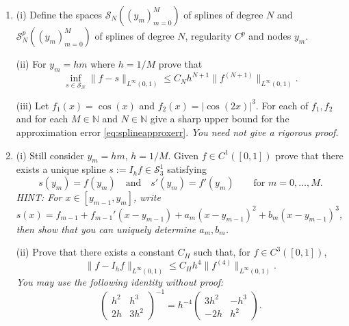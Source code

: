 \documentclass{exams}
\newcommand{\N}{\mathbb{N}}
\begin{document}
\begin{examcomp1}
\begin{question}
\begin{enumerate}
  \item (i) Define the spaces $\mathcal{S}_N((y_m)_{m=0}^M)$ of splines of
    degree $N$ and  $\mathcal{S}_N^p((y_m)_{m=0}^M)$ of splines of degree $N$,
    regularity $C^p$ and nodes $y_m$. 

    (ii) For $y_m = h m$ where $h = 1/M$ prove that  
    \begin{equation} \label{eq:splineapproxerr}
        \inf_{s \in \mathcal{S}_N} \|f - s \|_{L^\infty(0,1)}
        \leq 
        C_N h^{N+1} \| f^{(N+1)} \|_{L^\infty(0,1)}.
    \end{equation}

    (iii) Let $f_1(x) = \cos(x)$ and $f_2(x) = |\cos(2x)|^3$. 
    For each of $f_1, f_2$ and for each $M \in \N$ and $N \in \N$ give a
    sharp upper bound for the approximation error \eqref{eq:splineapproxerr}.
    {\it You need not give a rigorous proof.}

  \item (i) Still consider $y_m = h m$, $h = 1/M$. Given $f \in C^1([0,1])$
  prove that there exists a unique spline $s := I_h f \in \mathcal{S}_3^1$
  satisfying  
  \[
      s(y_m) = f(y_m) \quad \text{and} 
      \quad 
      s'(y_m) = f'(y_m) \qquad \text{for } m = 0, \dots, M.
  \]
  {\it HINT: For $x \in [y_{m-1}, y_m]$, write 
  $s(x) = f_{m-1} + f_{m-1}' (x-y_{m-1}) + a_m (x-y_{m-1})^2 
    + b_m (x - y_{m-1})^3$, then show that you can uniquely 
    determine $a_m, b_m$.}

  (ii) Prove that there exists a constant $C_H$ such that, 
  for $f \in C^3([0,1])$,   
  \[
      \| f - I_h f \|_{L^\infty(0,1)} \leq C_H h^4 \|f^{(4)}\|_{L^\infty(0,1)}.
  \]  
  {\it You may use the following identity without proof:
    \[
      \begin{pmatrix} 
        h^2 & h^3 \\ 
        2h & 3h^2 
      \end{pmatrix}^{-1}
      = 
      h^{-4} 
      \begin{pmatrix}
        3 h^2 & - h^3 \\ 
        -2h & h^2 
      \end{pmatrix}.
    \] 
  }

  \end{enumerate}
\end{question}

\clearpage

\begin{question}
  \begin{enumerate}


\end{enumerate}
\end{question}
\end{examcomp1}
\end{document}
